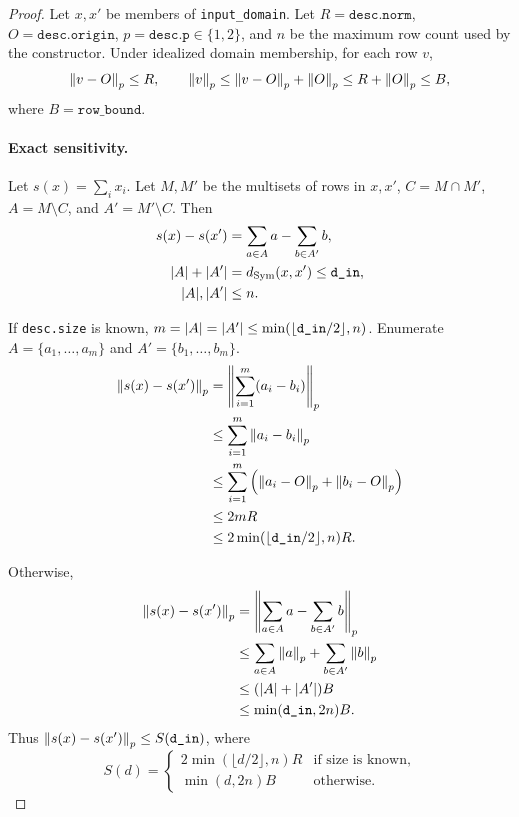 \documentclass{article}
\begin{document}
\begin{proof}
Let $x,x'$ be members of \texttt{input\_domain}.
Let $R=\texttt{desc.norm}$, $O=\texttt{desc.origin}$,
$p=\texttt{desc.p}\in\{1,2\}$, and $n$ be the maximum row count used by the constructor.
Under idealized domain membership, for each row $v$,
\[
    \norm{v-O}_p\le R,\qquad
    \norm{v}_p\le \norm{v-O}_p+\norm{O}_p\le R+\norm{O}_p\le B,
\]
where $B=\texttt{row\_bound}$.

\paragraph{Exact sensitivity.}
Let $s(x)=\sum_i x_i$.
Let $M,M'$ be the multisets of rows in $x,x'$,
$C=M\cap M'$, $A=M\setminus C$, and $A'=M'\setminus C$.
Then
\begin{align*}
    s(x)-s(x') &= \sum_{a\in A}a-\sum_{b\in A'}b,\\
    |A|+|A'| &= d_{\mathrm{Sym}}(x,x')\le \texttt{d\_in},\\
    |A|,|A'| &\le n.
\end{align*}

If \texttt{desc.size} is known, $m=|A|=|A'|\le\min(\lfloor\texttt{d\_in}/2\rfloor,n)$.
Enumerate $A=\{a_1,\ldots,a_m\}$ and $A'=\{b_1,\ldots,b_m\}$.
\begin{align*}
    \norm{s(x)-s(x')}_p
    &= \norm{\sum_{i=1}^m(a_i-b_i)}_p\\
    &\le \sum_{i=1}^m\norm{a_i-b_i}_p\\
    &\le \sum_{i=1}^m
        \left(\norm{a_i-O}_p+\norm{b_i-O}_p\right)\\
    &\le 2mR\\
    &\le 2\min(\lfloor\texttt{d\_in}/2\rfloor,n)R.
\end{align*}

Otherwise,
\begin{align*}
    \norm{s(x)-s(x')}_p
    &= \norm{\sum_{a\in A}a-\sum_{b\in A'}b}_p\\
    &\le \sum_{a\in A}\norm{a}_p+\sum_{b\in A'}\norm{b}_p\\
    &\le (|A|+|A'|)B\\
    &\le \min(\texttt{d\_in},2n)B.
\end{align*}
Thus $\norm{s(x)-s(x')}_p\le S(\texttt{d\_in})$, where
\[
    S(d)=
    \begin{cases}
        2\min(\lfloor d/2\rfloor,n)R & \text{if size is known},\\
        \min(d,2n)B & \text{otherwise}.
    \end{cases}
\]


\end{proof}
\end{document}
